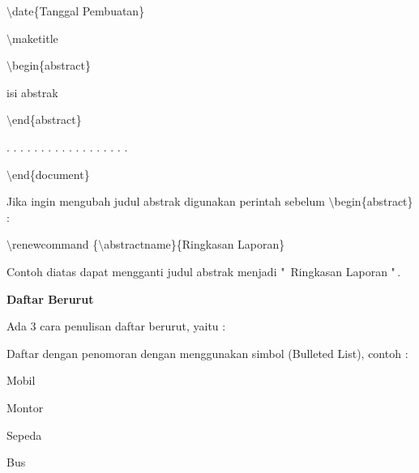 $\setminus$date\{Tanggal Pembuatan\}\par \vspace{12pt}

$\setminus$maketitle\par \vspace{12pt}

$\setminus$begin\{abstract\}\par \vspace{12pt}

isi abstrak\par \vspace{12pt}

$\setminus$end\{abstract\}\par \vspace{12pt}

. . . . . . . . . . . . . . . . . .\par \vspace{12pt}

$\setminus$end\{document\}\par \vspace{12pt}

Jika ingin mengubah judul abstrak digunakan perintah sebelum 
$\setminus$begin\{abstract\} :

$\setminus$renewcommand \{$\setminus$abstractname\}\{Ringkasan Laporan\}\par \vspace{12pt}

Contoh diatas dapat mengganti judul abstrak menjadi "\, Ringkasan Laporan "\,.\par \vspace{12pt}

\textbf{Daftar Berurut}\par \vspace{12pt}

Ada 3 cara penulisan daftar berurut, yaitu :

Daftar dengan penomoran dengan menggunakan simbol (Bulleted List), contoh :

Mobil\par \vspace{12pt}

Montor\par \vspace{12pt}

Sepeda\par \vspace{12pt}

Bus\par \vspace{12pt}

